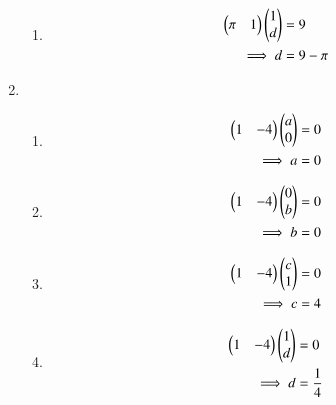 \begin{enumerate}
\begin{enumerate}
\item 
\begin{align}
\begin{pmatrix}\pi&1\end{pmatrix}\begin{pmatrix}1\\d\end{pmatrix} &= 9 \\
\implies d&=9-\pi
\end{align}
\end{enumerate}
\item 
\begin{enumerate}
 \item 
\begin{align}
\begin{pmatrix}1&-4\end{pmatrix}\begin{pmatrix}a\\0\end{pmatrix} &= 0 \\
\implies a&=0 
\end{align}

\item  
\begin{align}
\begin{pmatrix}1&-4\end{pmatrix}\begin{pmatrix}0\\b\end{pmatrix} &= 0 \\
\implies b&=0
\end{align}

\item  
\begin{align}
\begin{pmatrix}1&-4\end{pmatrix}\begin{pmatrix}c\\1\end{pmatrix} &= 0 \\
\implies c&=4  
\end{align}

\item  
\begin{align}
\begin{pmatrix}1&-4\end{pmatrix}\begin{pmatrix}1\\d\end{pmatrix} &= 0 \\
\implies d&=\frac{1}{4}
\end{align}

\end{enumerate}

\end{enumerate}
